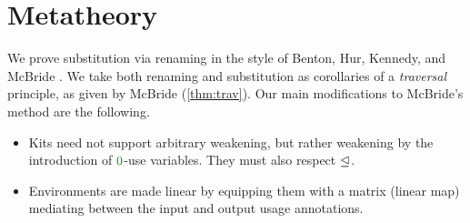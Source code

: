 \documentclass[submission,copyright,creativecommons]{eptcs}
\begin{document}
\begin{figure}
\end{figure}

\section{Metatheory}\label{sec:metatheory}

We prove substitution via renaming in the style of Benton, Hur, Kennedy, and
McBride \cite{bhkm12}.
We take both renaming and substitution as corollaries of a \emph{traversal}
principle, as given by McBride \cite{rensub05} (\autoref{thm:trav}).
Our main modifications to McBride's method are the following.
\begin{itemize}
  \item Kits need not support arbitrary weakening, but rather weakening by the
    introduction of $\rescomment 0$-use variables.
    They must also respect $\trianglelefteq$.
  \item Environments are made linear by equipping them with a matrix (linear
    map) mediating between the input and output usage annotations.
\end{itemize}
\end{document}
